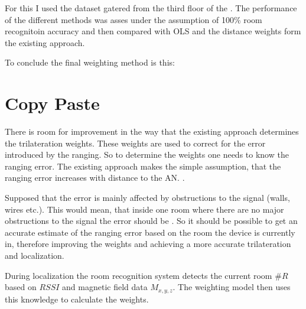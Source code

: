 For this I used the dataset gatered from the third floor of the . The performance of the different methods was asses under the assumption of 100\% room recognitoin accuracy and then compared with OLS and the distance weights form the existing approach.


To conclude the final weighting method is this:



\section{Copy Paste}
There is room for improvement in the way that the existing approach determines the trilateration weights. These weights are used to correct for the error introduced by the ranging. So to determine the weights one needs to know the ranging error. The existing approach makes the simple assumption, that the ranging error increases with distance to the AN. .

Supposed that the error is mainly affected by obstructions to the signal (walls, wires etc.). This would mean, that inside one room where there are no major obstructions to the signal the error should be . So it should be possible to get an accurate estimate of the ranging error based on the room the device is currently in, therefore improving the weights and achieving a more accurate trilateration and localization.

During localization the room recognition system detects the current room \(\#R\) based on \(RSSI\) and magnetic field data \(M_{x,y,z}\). The weighting model then uses this knowledge to calculate the weights. 